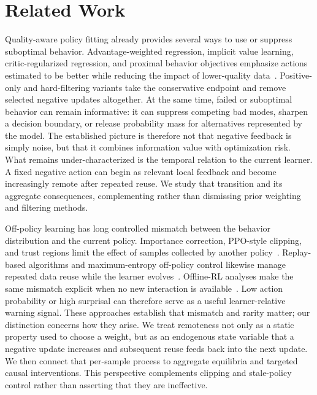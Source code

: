 \section{Related Work}
\label{sec:related}

Quality-aware policy fitting already provides several ways to use or suppress suboptimal behavior. Advantage-weighted regression, implicit value learning, critic-regularized regression, and proximal behavior objectives emphasize actions estimated to be better while reducing the impact of lower-quality data~\cite{peng2019advantage,kostrikov2021offline,wang2020critic,zhuang2023behavior}. Positive-only and hard-filtering variants take the conservative endpoint and remove selected negative updates altogether. At the same time, failed or suboptimal behavior can remain informative: it can suppress competing bad modes, sharpen a decision boundary, or release probability mass for alternatives represented by the model. The established picture is therefore not that negative feedback is simply noise, but that it combines information value with optimization risk. What remains under-characterized is the temporal relation to the current learner. A fixed negative action can begin as relevant local feedback and become increasingly remote after repeated reuse. We study that transition and its aggregate consequences, complementing rather than dismissing prior weighting and filtering methods.

Off-policy learning has long controlled mismatch between the behavior distribution and the current policy. Importance correction, PPO-style clipping, and trust regions limit the effect of samples collected by another policy~\cite{schulman2017proximal}. Replay-based algorithms and maximum-entropy off-policy control likewise manage repeated data reuse while the learner evolves~\cite{haarnoja2018soft}. Offline-RL analyses make the same mismatch explicit when no new interaction is available~\cite{levine2020offline,fu2020d4rl}. Low action probability or high surprisal can therefore serve as a useful learner-relative warning signal. These approaches establish that mismatch and rarity matter; our distinction concerns how they arise. We treat remoteness not only as a static property used to choose a weight, but as an endogenous state variable that a negative update increases and subsequent reuse feeds back into the next update. We then connect that per-sample process to aggregate equilibria and targeted causal interventions. This perspective complements clipping and stale-policy control rather than asserting that they are ineffective.

